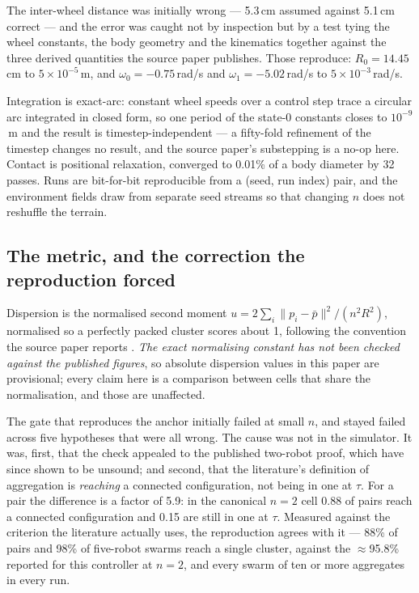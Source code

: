 \documentclass[11pt,a4paper]{article}
\begin{document}
The inter-wheel distance was initially wrong --- 5.3\,cm assumed against 5.1\,cm
correct --- and the error was caught not by inspection but by a test tying the
wheel constants, the body geometry and the kinematics together against the three
derived quantities the source paper publishes. Those reproduce: $R_0 = 14.45$\,cm
to $5\times10^{-5}$\,m, and $\omega_0 = -0.75$\,rad/s and $\omega_1 =
-5.02$\,rad/s to $5\times10^{-3}$\,rad/s.

Integration is exact-arc: constant wheel speeds over a control step trace a
circular arc integrated in closed form, so one period of the state-0 constants
closes to $10^{-9}$\,m and the result is timestep-independent --- a fifty-fold
refinement of the timestep changes no result, and the source paper's substepping
is a no-op here. Contact is positional relaxation, converged to 0.01\% of a body
diameter by 32 passes. Runs are bit-for-bit reproducible from a (seed, run index)
pair, and the environment fields draw from separate seed streams so that changing
$n$ does not reshuffle the terrain.

\subsection{The metric, and the correction the reproduction forced}

Dispersion is the normalised second moment
$u = 2\sum_i \lVert p_i - \bar p\rVert^2 / (n^2 R^2)$, normalised so a perfectly
packed cluster scores about 1, following the convention the source paper reports
\citep{grahamsloane1990}. \emph{The exact
normalising constant has not been checked against the published figures}, so
absolute dispersion values in this paper are provisional; every claim here is a
comparison between cells that share the normalisation, and those are unaffected.

The gate that reproduces the anchor initially failed at small $n$, and stayed
failed across five hypotheses that were all wrong. The cause was not in the
simulator. It was, first, that the check appealed to the published two-robot
proof, which \citet{steinberg2025} have since shown to be unsound; and second,
that the literature's definition of aggregation is \emph{reaching} a connected
configuration, not being in one at $\tau$. For a pair the difference is a factor of
5.9: in the canonical $n = 2$ cell 0.88 of pairs reach a connected configuration
and 0.15 are still in one at $\tau$. Measured against the
criterion the literature actually uses, the reproduction agrees with it --- 88\%
of pairs and 98\% of five-robot swarms reach a single cluster, against the
$\approx$95.8\% reported for this controller at $n = 2$, and every swarm of ten
or more aggregates in every run.
\end{document}
